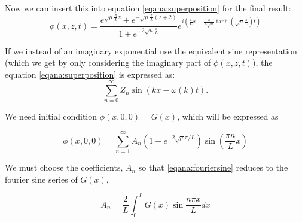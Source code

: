 \documentclass[11pt]{article}
\begin{document}
Now we can insert this into equation \ref{eqana:superposition} for the final result:
\begin{equation*}
\phi(x,z,t) = \frac{ e^{ \sqrt{\mu} \frac{\pi }{L}z}  + e^{ -\sqrt{\mu}\frac{\pi }{L}(z+2)    }}{1 + e^{-2\sqrt{\mu}\frac{\pi }{L} }} e^{i \left( \frac{\pi }{L}x - \frac{\pi }{L\sqrt{\mu}} \tanh (\sqrt{\mu}\frac{\pi }{L})t \right)}
\end{equation*}




If we instead of an imaginary exponential use the equivalent sine representation (which we get by only considering the imaginary part of $\phi(x,z,t)$), the equation \ref{eqana:superposition} is expressed as:
\begin{equation*}
\sum_{n=0}^\infty Z_n \sin \left(  kx-\omega(k)t  \right).
\end{equation*}

We need initial condition $\phi(x,0,0) = G(x)$, which will be expressed as

\begin{equation}
\label{eqana:fouriersine}
\phi(x,0,0) = \sum_{n=1}^\infty A_n \left( 1 + e^{-2\sqrt{\mu}\pi/L} \right) \sin \left( \frac{\pi n}{L}x \right)
\end{equation}

We must choose the coefficients, $A_n$ so that \ref{eqana:fouriersine} reduces to the fourier sine series of $G(x)$,

\begin{equation*}
A_n = \frac{2}{L} \int_0^L G(x) \sin \frac{n \pi x}{L} d x
\end{equation*}
%
%
\end{document}
